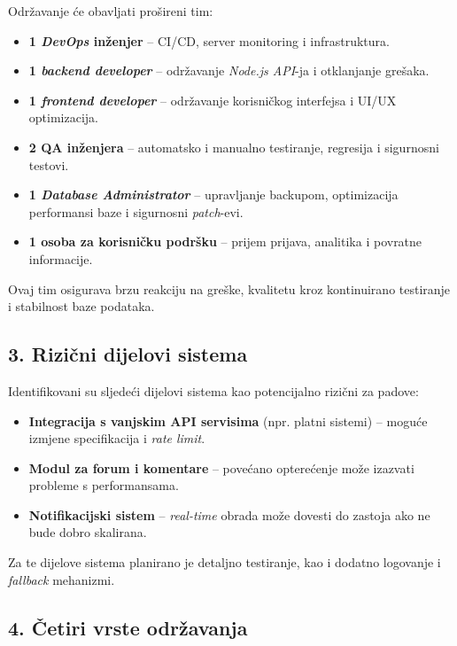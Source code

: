 Održavanje će obavljati prošireni tim:

\begin{itemize}
  \item \textbf{1 \emph{DevOps} inženjer} – CI/CD, server monitoring i infrastruktura.
  \item \textbf{1 \emph{backend developer}} – održavanje \emph{Node.js API}-ja i otklanjanje grešaka.
  \item \textbf{1 \emph{frontend developer}} – održavanje korisničkog interfejsa i UI/UX optimizacija.
  \item \textbf{2 QA inženjera} – automatsko i manualno testiranje, regresija i sigurnosni testovi.
  \item \textbf{1 \emph{Database Administrator}} – upravljanje backupom, optimizacija performansi baze i sigurnosni \emph{patch}-evi.
  \item \textbf{1 osoba za korisničku podršku} – prijem prijava, analitika i povratne informacije.
\end{itemize}

Ovaj tim osigurava brzu reakciju na greške, kvalitetu kroz kontinuirano testiranje i stabilnost baze podataka.


\subsection*{3. Rizični dijelovi sistema}

Identifikovani su sljedeći dijelovi sistema kao potencijalno rizični za padove:

\begin{itemize}
  \item \textbf{Integracija s vanjskim API servisima} (npr. platni sistemi) – moguće izmjene specifikacija i \emph{rate limit}.
  \item \textbf{Modul za forum i komentare} – povećano opterećenje može izazvati probleme s performansama.
  \item \textbf{Notifikacijski sistem} – \emph{real-time} obrada može dovesti do zastoja ako ne bude dobro skalirana.
\end{itemize}

Za te dijelove sistema planirano je detaljno testiranje, kao i dodatno logovanje i \emph{fallback} mehanizmi.

\subsection*{4. Četiri vrste održavanja}

